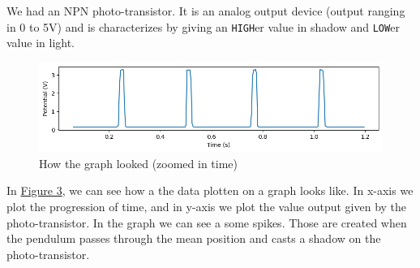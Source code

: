 		We had an NPN photo-transistor. It is an analog output device (output ranging in 0 to 5V) and is characterizes by giving an \texttt{HIGH}er value in shadow and \texttt{LOW}er value in light.

		\begin{figure}[H]
			\centering
			\includegraphics[width=0.8\columnwidth]{images/example_graph.png}
			\caption{How the graph looked (zoomed in time)}
			\label{th:3}
		\end{figure}

		In \hyperref[th:3]{Figure 3}, we can see how a the data plotten on a graph looks like. In x-axis we plot the progression of time, and in y-axis we plot the value output given by the photo-transistor. In the graph we can see a some spikes. Those are created when the pendulum passes through the mean position and casts a shadow on the photo-transistor.